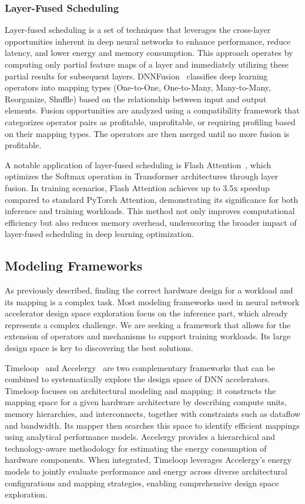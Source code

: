 \documentclass[lettersize,journal]{IEEEtran}
\begin{document}
\subsubsection{Layer-Fused Scheduling}
Layer-fused scheduling is a set of techniques that leverages the cross-layer opportunities inherent in deep neural networks to enhance performance, reduce latency, and lower energy and memory consumption. This approach operates by computing only partial feature maps of a layer and immediately utilizing these partial results for subsequent layers. 
DNNFusion~\cite{dnnfusion2021} classifies deep learning operators into mapping types (One-to-One, One-to-Many, Many-to-Many, Reorganize, Shuffle) based on the relationship between input and output elements. Fusion opportunities are analyzed using a compatibility framework that categorizes operator pairs as profitable, unprofitable, or requiring profiling based on their mapping types. The operators are then merged until no more fusion is profitable. 


A notable application of layer-fused scheduling is Flash Attention~\cite{dao2022flashattention, dao2023flashattention2}, which optimizes the Softmax operation in Transformer architectures through layer fusion. In training scenarios, Flash Attention achieves up to 3.5x speedup compared to standard PyTorch Attention, demonstrating its significance for both inference and training workloads. This method not only improves computational efficiency but also reduces memory overhead, underscoring the broader impact of layer-fused scheduling in deep learning optimization.
\subsection{Modeling Frameworks}
As previously described, finding the correct hardware design for a workload and its mapping is a complex task. Most modeling frameworks used in neural network accelerator design space exploration focus on the inference part, which already represents a complex challenge. We are seeking a framework that allows for the extension of operators and mechanisms to support training workloads. Its large design space is key to discovering the best solutions.

Timeloop~\cite{timeloop} and Accelergy~\cite{accelergy} are two complementary frameworks that can be combined to systematically explore the design space of DNN accelerators. Timeloop focuses on architectural modeling and mapping: it constructs the mapping space  for a given hardware architecture by describing compute units, memory hierarchies, and interconnects, together with constraints such as dataflow and bandwidth. Its mapper then searches this space to identify efficient mappings using analytical performance models.
Accelergy provides a hierarchical and technology-aware methodology for estimating the energy consumption of hardware components. When integrated, Timeloop leverages Accelergy’s energy models to jointly evaluate performance and energy across diverse architectural configurations and mapping strategies, enabling comprehensive design space exploration.
\end{document}
